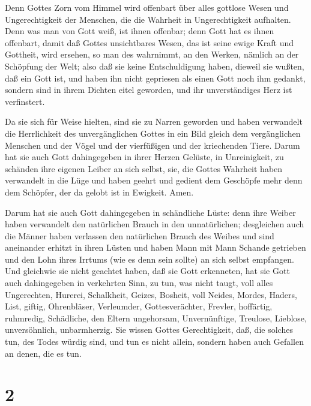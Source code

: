  Denn Gottes Zorn vom Himmel wird offenbart über alles
gottlose Wesen und Ungerechtigkeit der Menschen, die die Wahrheit in
Ungerechtigkeit aufhalten.  Denn was man von Gott weiß, ist
ihnen offenbar; denn Gott hat es ihnen offenbart,  damit
daß Gottes unsichtbares Wesen, das ist seine ewige Kraft und Gottheit,
wird ersehen, so man des wahrnimmt, an den Werken, nämlich an der
Schöpfung der Welt; also daß sie keine Entschuldigung haben,
 dieweil sie wußten, daß ein Gott ist, und haben ihn nicht
gepriesen als einen Gott noch ihm gedankt, sondern sind in ihrem Dichten
eitel geworden, und ihr unverständiges Herz ist verfinstert.

 Da sie sich für Weise hielten, sind sie zu Narren geworden
 und haben verwandelt die Herrlichkeit des unvergänglichen
Gottes in ein Bild gleich dem vergänglichen Menschen und der Vögel und
der vierfüßigen und der kriechenden Tiere.  Darum hat sie
auch Gott dahingegeben in ihrer Herzen Gelüste, in Unreinigkeit, zu
schänden ihre eigenen Leiber an sich selbst,  sie, die
Gottes Wahrheit haben verwandelt in die Lüge und haben geehrt und
gedient dem Geschöpfe mehr denn dem Schöpfer, der da gelobt ist in
Ewigkeit. Amen.

 Darum hat sie auch Gott dahingegeben in schändliche Lüste:
denn ihre Weiber haben verwandelt den natürlichen Brauch in den
unnatürlichen;  desgleichen auch die Männer haben verlassen
den natürlichen Brauch des Weibes und sind aneinander erhitzt in ihren
Lüsten und haben Mann mit Mann Schande getrieben und den Lohn ihres
Irrtums (wie es denn sein sollte) an sich selbst empfangen.
 Und gleichwie sie nicht geachtet haben, daß sie Gott
erkenneten, hat sie Gott auch dahingegeben in verkehrten Sinn, zu tun,
was nicht taugt,  voll alles Ungerechten, Hurerei,
Schalkheit, Geizes, Bosheit, voll Neides, Mordes, Haders, List, giftig,
Ohrenbläser,  Verleumder, Gottesverächter, Frevler,
hoffärtig, ruhmredig, Schädliche, den Eltern ungehorsam, 
Unvernünftige, Treulose, Lieblose, unversöhnlich, unbarmherzig.
 Sie wissen Gottes Gerechtigkeit, daß, die solches tun, des
Todes würdig sind, und tun es nicht allein, sondern haben auch Gefallen
an denen, die es tun.

\hypertarget{section-1}{%
\section{2}\label{section-1}}

